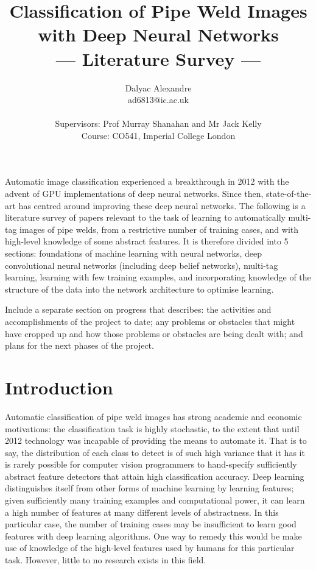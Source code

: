 \documentclass[a4paper,11pt]{article}
\title{Classification of Pipe Weld Images with Deep Neural Networks\\\Large{--- Literature Survey ---}}
\author{Dalyac Alexandre\\
       ad6813@ic.ac.uk\\ \\
       \small{Supervisors: Prof Murray Shanahan and Mr Jack Kelly}\\
       \small{Course: CO541, Imperial College London}
}
\begin{document}
\maketitle

\abstract
{
\par Automatic image classification experienced a breakthrough in 2012 with the advent of GPU implementations of deep neural networks. Since then, state-of-the-art has centred around improving these deep neural networks. The following is a literature survey of papers relevant to the task of learning to automatically multi-tag images of pipe welds, from a restrictive number of training cases, and with high-level knowledge of some abstract features. It is therefore divided into 5 sections: foundations of machine learning with neural networks, deep convolutional neural networks (including deep belief networks), multi-tag learning, learning with few training examples, and incorporating knowledge of the structure of the data into the network architecture to optimise learning.\\

\par Include a separate section on progress that describes: the activities and accomplishments of the project to date; any problems or obstacles that might have cropped up and how those problems or obstacles are being dealt with; and plans for the next phases of the project.
}

\clearpage
\tableofcontents
\clearpage

\section{Introduction}

\par Automatic classification of pipe weld images has strong academic and economic motivations: the classification task is highly stochastic, to the extent that until 2012 technology was incapable of providing the means to automate it. That is to say, the distribution of each class to detect is of such high variance that it has it is rarely possible for computer vision programmers to hand-specify sufficiently abstract feature detectors that attain high classification accuracy. Deep learning distinguishes itself from other forms of machine learning by learning features; given sufficiently many training examples and computational power, it can learn a high number of features at many different levels of abstractness. In this particular case, the number of training cases may be insufficient to learn good features with deep learning algorithms. One way to remedy this would be make use of knowledge of the high-level features used by humans for this particular task. However, little to no research exists in this field.
\end{document}
